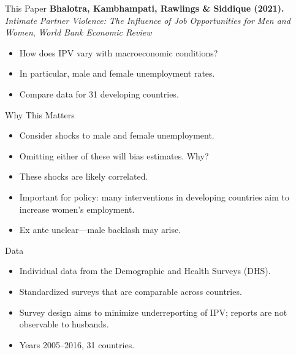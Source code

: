 \documentclass[11pt,notes=hide,aspectratio=169,mathserif]{beamer}
\begin{document}
\begin{frame}{This Paper}
\textbf{Bhalotra, Kambhampati, Rawlings \& Siddique (2021).} \emph{Intimate Partner Violence: The Influence of Job Opportunities for Men and Women}, \textit{World Bank Economic Review}
\begin{itemize}
  \item How does IPV vary with macroeconomic conditions?
  \item In particular, male and female unemployment rates.
  \item Compare data for 31 developing countries.
\end{itemize}
\end{frame}

\begin{frame}{Why This Matters}
\begin{itemize}
  \item Consider shocks to male and female unemployment.
  \item Omitting either of these will bias estimates. Why?
  \pause \item These shocks are likely correlated.
  \item Important for policy: many interventions in developing countries aim to increase women's employment.
  \item Ex ante unclear—male backlash may arise.
\end{itemize}
\end{frame}

\begin{frame}{Data}
\begin{itemize}
  \item Individual data from the Demographic and Health Surveys (DHS).
  \item Standardized surveys that are comparable across countries.
  \item Survey design aims to minimize underreporting of IPV; reports are not observable to husbands.
  \item Years 2005--2016, 31 countries.
\end{itemize}
\end{frame}
\end{document}
